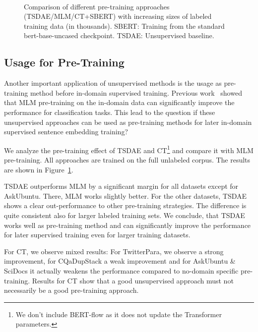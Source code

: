 \documentclass[11pt,a4paper]{article}
\begin{document}
\begin{figure}[t]
  \centering
  \\
  \caption{Comparison of different pre-training approaches (TSDAE/MLM/CT+SBERT) with increasing sizes of labeled training data (in thousands). SBERT: Training from the standard bert-base-uncased checkpoint. TSDAE: Unsupervised baseline.}
  \label{fig:pretraining_effect}
\end{figure}

\subsection{Usage for Pre-Training}
Another important application of unsupervised methods is the usage as pre-training method before in-domain supervised training. Previous work~\citep{DBLP:conf/acl/GururanganMSLBD20} showed that MLM pre-training on the in-domain data can significantly improve the performance for classification tasks. This lead to the question if these unsupervised approaches can be used as pre-training methods for later in-domain supervised sentence embedding training? 

We analyze the pre-training effect of TSDAE and CT\footnote{We don't include BERT-flow as it does not update the Transformer parameters.} and compare it with MLM pre-training. All approaches are trained on the full unlabeled corpus. The results are shown in Figure~\ref{fig:pretraining_effect}. 

TSDAE outperforms MLM by a significant margin for all datasets except for AskUbuntu. There, MLM works slightly better. For the other datasets, TSDAE shows a clear out-performance to other pre-training strategies. The difference is quite consistent also for larger labeled training sets. We conclude, that TSDAE works well as pre-training method and can significantly improve the performance for later supervised training even for larger training datasets.

For CT, we observe mixed results: For TwitterPara, we observe a strong improvement, for CQaDupStack a weak improvement and for AskUbuntu \& SciDocs it actually weakens the performance compared to no-domain specific pre-training. Results for CT show that a good unsupervised approach must not necessarily be a good pre-training approach.   
\end{document}
